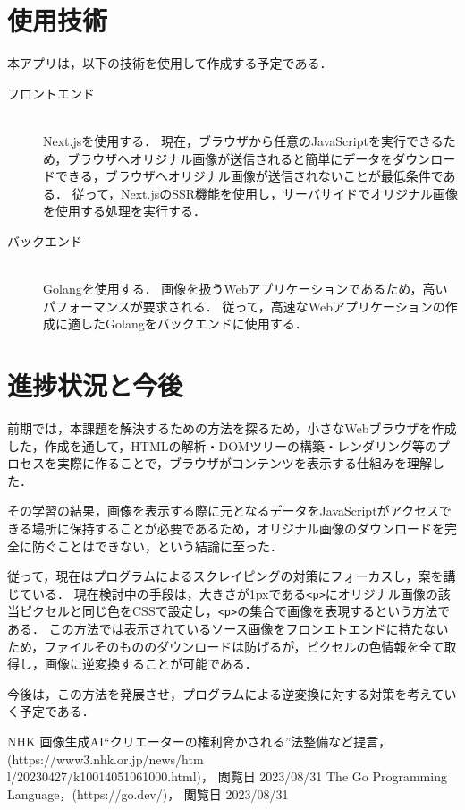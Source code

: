 ﻿\documentclass[twocolumn,a4j]{jarticle}
\begin{document}
\section{使用技術}
本アプリは，以下の技術を使用して作成する予定である．
\begin{description}
  \item[フロントエンド]\mbox{}\\
  \quad Next.jsを使用する．
  現在，ブラウザから任意のJavaScriptを実行できるため，ブラウザへオリジナル画像が送信されると簡単にデータをダウンロードできる，ブラウザへオリジナル画像が送信されないことが最低条件である．
  従って，Next.jsのSSR機能を使用し，サーバサイドでオリジナル画像を使用する処理を実行する．
  \item[バックエンド]\mbox{}\\
  \quad Golangを使用する．
  画像を扱うWebアプリケーションであるため，高いパフォーマンスが要求される．
  従って，高速なWebアプリケーションの作成に適したGolangをバックエンドに使用する\cite{go}．
\end{description}


\section{進捗状況と今後}
前期では，本課題を解決するための方法を探るため，小さなWebブラウザを作成した，作成を通して，HTMLの解析・DOMツリーの構築・レンダリング等のプロセスを実際に作ることで，ブラウザがコンテンツを表示する仕組みを理解した．\par
その学習の結果，画像を表示する際に元となるデータをJavaScriptがアクセスできる場所に保持することが必要であるため，オリジナル画像のダウンロードを完全に防ぐことはできない，という結論に至った．\par
従って，現在はプログラムによるスクレイピングの対策にフォーカスし，案を講じている．
現在検討中の手段は，大きさが1pxである\lstinline!<p>!にオリジナル画像の該当ピクセルと同じ色をCSSで設定し，\lstinline|<p>|の集合で画像を表現するという方法である．
この方法では表示されているソース画像をフロンエトエンドに持たないため，ファイルそのもののダウンロードは防げるが，ピクセルの色情報を全て取得し，画像に逆変換することが可能である．\par
今後は，この方法を発展させ，プログラムによる逆変換に対する対策を考えていく予定である．


\begin{thebibliography}{9}\setlength{\itemsep}{-2pt}
   NHK 画像生成AI“クリエーターの権利脅かされる”法整備など提言，(https://www3.nhk.or.jp/news/htm\\l/20230427/k10014051061000.html)， 閲覧日 2023/08/31
   The Go Programming Language，(https://go.dev/)， 閲覧日 2023/08/31
\end{thebibliography}
\end{document}
